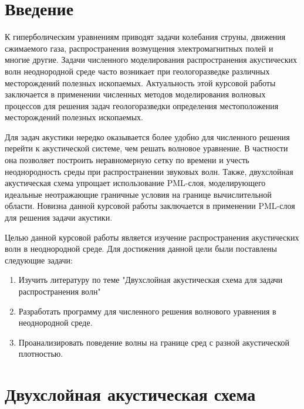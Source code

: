 \documentclass[a4paper, fontsize=14pt]{article}
\begin{document}

\newpage
\tableofcontents
\newpage
\section*{Введение}

К гиперболическим уравнениям приводят задачи колебания струны, движения сжимаемого газа,
распространения возмущения электромагнитных полей и многие другие. Задачи численного моделирования
распространения акустических волн неоднородной среде часто возникает при геологоразведке различных
месторождений полезных ископаемых. 
Актуальность этой курсовой работы заключается в применении численных методов моделирования волновых
процессов для решения задач геологоразведки определения местоположения месторождений полезных
ископаемых. 

Для задач акустики нередко оказывается более удобно для численного решения перейти к акустической
системе, чем решать волновое уравнение. В частности она позволяет построить неравномерную сетку по
времени и учесть неоднородность среды при распространении звуковых волн. Также, двухслойная
акустическая схема упрощает использование PML-слоя, моделирующего идеальные неотражающие граничные условия на
границе вычислительной области.
Новизна данной курсовой работы заключается в применении PML-слоя для решения задачи акустики.

Целью данной курсовой работы является изучение распространения акустических волн в неоднородной
среде. Для достижения данной цели были поставлены следующие задачи:
\begin{enumerate}
    \item Изучить литературу по теме "Двухслойная акустическая схема для задачи распространения волн"
    \item Разработать программу для численного решения волнового уравнения в неоднородной среде.
    \item Проанализировать поведение волны на границе сред с разной акустической плотностью.
\end{enumerate}
\newpage
\section{Двухслойная акустическая схема}
\end{document}
